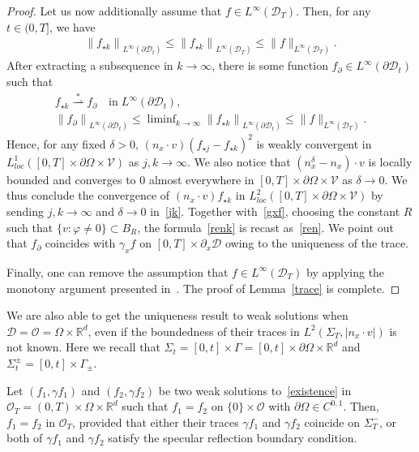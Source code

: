 \documentclass[AHL,Unicode,longabstracts,published]{cedram}
\newcommand*\p{\partial}
\newcommand*\R {\mathbb{R}}
\newcommand*\V {\mathcal{V}}
\newcommand*\D {\mathcal{D}}
\newcommand*\OO {\mathcal{O}}
\begin{document}
\begin{proof}
Let us now additionally assume that $f\in L^\infty(\D_T)$. Then, for any $t\in(0,T]$, we have
\begin{align*}
\left\|f_{\star k}\right\|_{L^\infty(\p\D_t)} \le \left\|f_{\star k}\right\|_{L^\infty(\D_T)} \le \|f\|_{L^\infty(\D_T)}.
\end{align*}
After extracting a subsequence in $k\rightarrow\infty$, there is some function $f_\p\in L^\infty(\p\D_t)$ such that
\begin{multline}\label{gxf}
f_{\star k}\stackrel{\ast}{\rightharpoonup}f_\p \quad \text{in}\; L^\infty(\p\D_t),\\
\left\|f_\p\right\|_{L^\infty(\p\D_t)}
\le \liminf\nolimits_{k\rightarrow\infty}\left\|f_{\star k}\right\|_{L^\infty(\p\D_t)}
\le \|f\|_{L^\infty(\D_T)}.
\end{multline}
Hence, for any fixed $\delta>0$, $(n_x\cdot v)(f_{\star j}-f_{\star k})^2$ is weakly convergent in $L_{loc}^1([0,T]\times\p\Omega\times\V)$ as $j,k\rightarrow\infty$. We also notice that $(n_x^\delta-n_x) \cdot v$ is locally bounded and converges to $0$ almost everywhere in $[0,T]\times\p\Omega\times\V$ as $\delta\rightarrow 0$. We thus conclude the convergence of $(n_x\cdot v)f_{\star k}$ in $L_{loc}^2([0,T]\times\p\Omega\times\V)$ by sending $j,k\rightarrow\infty$ and $\delta\rightarrow0$ in~\eqref{jk}. Together with~\eqref{gxf}, choosing the constant $R$ such that $\{v:\varphi\neq0\}\subset B_R$, the formula~\eqref{renk} is recast as~\eqref{ren}. We point out that $f_\p$ coincides with $\gamma_xf$ on $[0,T]\times\p_x\D$ owing to the uniqueness of the trace.

Finally, one can remove the assumption that $f\in L^\infty(\D_T)$ by applying the monotony argument presented in~\cite[Proof of Theorem~4.5]{Mischler3}. The proof of Lemma~\ref{trace} is complete.
\end{proof}

We are also able to get the uniqueness result to weak solutions when $\D=\OO=\Omega\times\R^d$, even if the boundedness of their traces in $L^2(\Sigma_T,|n_x\cdot v|)$ is not known. Here we recall that $\Sigma_t=[0,t]\times\Gamma=[0,t]\times\p\Omega\times\R^d$ and $\Sigma_t^\pm=[0,t]\times\Gamma_\pm$.

\begin{coro}[uniqueness]\label{unique}
Let $(f_1,\gamma f_1)$ and $(f_2,\gamma f_2)$ be two weak solutions to~\eqref{existence} in $\OO_T=(0,T)\times\Omega\times\R^d$ such that $f_1=f_2$ on $\{0\}\times\OO$ with $\p\Omega\in C^{0,1}$. Then, $f_1=f_2$ in $\OO_T$, provided that either their traces $\gamma f_1$ and $\gamma f_2$ coincide on $\Sigma_T^-$, or both of $\gamma f_1$ and $\gamma f_2$ satisfy the specular reflection boundary condition.
\end{coro}
\end{document}
